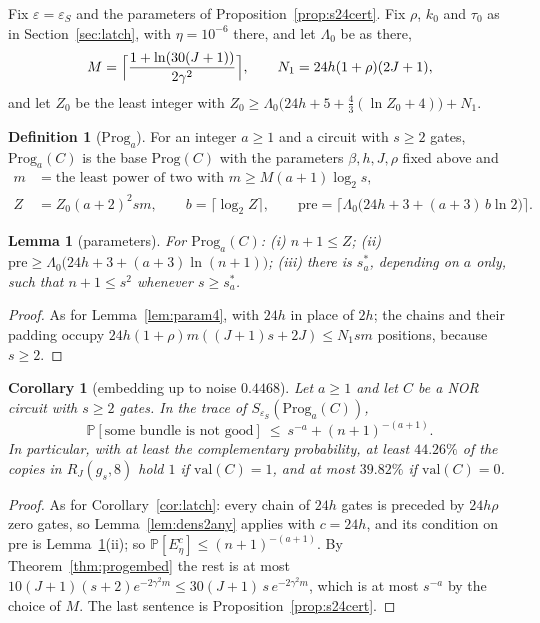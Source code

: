 \documentclass[11pt]{amsart}
\newtheorem{lemma}[theorem]{Lemma}
\newtheorem{corollary}[theorem]{Corollary}
\theoremstyle{definition}
\newtheorem{definition}[theorem]{Definition}
\theoremstyle{remark}
\newcommand{\eps}{\varepsilon}
\newcommand{\val}{\mathrm{val}}
\newcommand{\PP}{\mathbb{P}}
\begin{document}
Fix $\eps=\eps_S$ and the parameters of Proposition~\ref{prop:s24cert}. Fix $\rho$, $k_0$ and
$\tau_0$ as in Section~\ref{sec:latch}, with $\eta=10^{-6}$ there, and let $\Lambda_0$ be as there,
\[
M=\Bigl\lceil\frac{1+\ln(30(J+1))}{2\gamma^2}\Bigr\rceil,\qquad N_1=24h(1+\rho)(2J+1),
\]
and let $Z_0$ be the least integer with
$Z_0\ge\Lambda_0\bigl(24h+5+\tfrac43(\ln Z_0+4)\bigr)+N_1$.

\begin{definition}[$\mathrm{Prog}_a$]\label{def:proga}
For an integer $a\ge1$ and a circuit with $s\ge2$ gates, $\mathrm{Prog}_a(C)$ is the base
$\mathrm{Prog}(C)$ with the parameters $\beta,h,J,\rho$ fixed above and
\begin{align*}
m&=\text{the least power of two with }m\ge M(a+1)\log_2s,\\
Z&=Z_0(a+2)^2sm,\qquad b=\lceil\log_2Z\rceil,\qquad
\mathrm{pre}=\bigl\lceil\Lambda_0\bigl(24h+3+(a+3)\,b\ln2\bigr)\bigr\rceil .
\end{align*}
\end{definition}

\begin{lemma}[parameters]\label{lem:paramprog}
For $\mathrm{Prog}_a(C)$: (i) $n+1\le Z$; (ii)
$\mathrm{pre}\ge\Lambda_0\bigl(24h+3+(a+3)\ln(n+1)\bigr)$; (iii) there is $s^\ast_a$, depending on
$a$ only, such that $n+1\le s^2$ whenever $s\ge s^\ast_a$.
\end{lemma}

\begin{proof}
As for Lemma~\ref{lem:param4}, with $24h$ in place of $2h$; the chains and their padding occupy
$24h(1+\rho)m((J+1)s+2J)\le N_1sm$ positions, because $s\ge2$.
\end{proof}

\begin{corollary}[embedding up to noise $0.4468$]\label{cor:prog}
Let $a\ge1$ and let $C$ be a NOR circuit with $s\ge2$ gates. In the trace of
$S_{\eps_S}(\mathrm{Prog}_a(C))$,
\[
\PP[\text{some bundle is not good}]\ \le\ s^{-a}+(n+1)^{-(a+1)} .
\]
In particular, with at least the complementary probability, at least $44.26\%$ of the copies in
$R_J(g_s,8)$ hold $1$ if $\val(C)=1$, and at most $39.82\%$ if $\val(C)=0$.
\end{corollary}

\begin{proof}
As for Corollary~\ref{cor:latch}: every chain of $24h$ gates is preceded by $24h\rho$ zero gates,
so Lemma~\ref{lem:dens2any} applies with $c=24h$, and its condition on $\mathrm{pre}$ is
Lemma~\ref{lem:paramprog}(ii); so $\PP[E_\eta^c]\le(n+1)^{-(a+1)}$. By
Theorem~\ref{thm:progembed} the rest is at most $10(J+1)(s+2)e^{-2\gamma^2m}\le30(J+1)\,s\,e^{-2\gamma^2m}$,
which is at most $s^{-a}$ by the choice of $M$. The last sentence is
Proposition~\ref{prop:s24cert}.
\end{proof}
\end{document}
